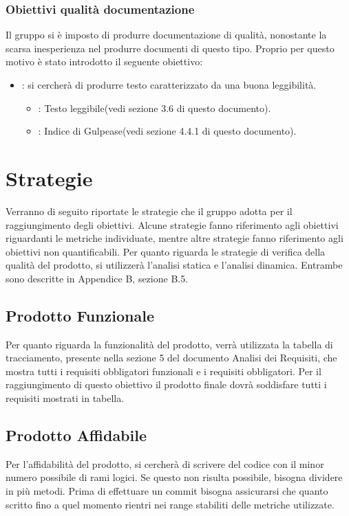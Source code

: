 \subsubsection{Obiettivi qualità documentazione}
Il gruppo \NomeGruppo{} si è imposto di produrre documentazione di qualità, nonostante la scarsa inesperienza nel produrre documenti di questo tipo. Proprio per questo motivo è stato introdotto il seguente obiettivo:
\begin{itemize}
\item {}: si cercherà di produrre testo caratterizzato da una buona leggibilità.
\begin{itemize}
\item {}: Testo leggibile(vedi sezione 3.6 di questo documento).
\item {}: Indice di Gulpease(vedi sezione 4.4.1 di questo documento).
\end{itemize}
\end{itemize} 

\newpage

\section{Strategie}
Verranno di seguito riportate le strategie che il gruppo adotta per il raggiungimento degli obiettivi. Alcune strategie fanno riferimento agli obiettivi riguardanti le metriche individuate, mentre altre strategie fanno riferimento agli obiettivi non quantificabili.
Per quanto riguarda le strategie di verifica della qualità del prodotto, si utilizzerà l'analisi statica e l'analisi dinamica. Entrambe sono descritte in Appendice B, sezione B.5.

\subsection{Prodotto Funzionale}
Per quanto riguarda la funzionalità del prodotto, verrà utilizzata la tabella di tracciamento, presente nella sezione 5 del documento Analisi dei Requisiti, che mostra tutti i requisiti obbligatori funzionali e i requisiti obbligatori. Per il raggiungimento di questo obiettivo il prodotto finale dovrà soddisfare tutti i requisiti mostrati in tabella.

\subsection{Prodotto Affidabile}
Per l'affidabilità del prodotto, si cercherà di scrivere del codice con il minor numero possibile di rami logici. Se questo non risulta possibile, bisogna dividere in più metodi. Prima di effettuare un commit bisogna assicurarsi che quanto scritto fino a quel momento rientri nei range stabiliti delle metriche utilizzate.

